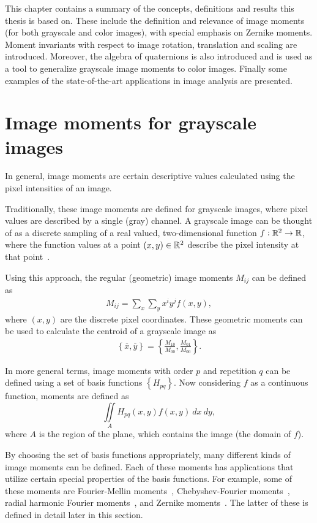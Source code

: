 This chapter contains a summary of the concepts, definitions and results this thesis is based on. These include the definition and relevance of image moments (for both grayscale and color images), with special emphasis on Zernike moments. Moment invariants with respect to image rotation, translation and scaling are introduced.
Moreover, the algebra of quaternions is also introduced and is used as a tool to generalize grayscale image moments to color images.
Finally some examples of the state-of-the-art applications in image analysis are presented.

\section{Image moments for grayscale images}\label{sec:grayscale}
In general, image moments are certain descriptive values calculated using the pixel intensities of an image. 

Traditionally, these image moments are defined for grayscale images, where pixel values are described by a single (gray) channel. A grayscale image can be thought of as a discrete sampling of a real valued, two-dimensional function $f : \mathbb{R}^2 \rightarrow \mathbb{R}$, where the function values at a point $(x,y) \in \mathbb{R}^2$ describe the pixel intensity at that point~\cite{moment_book}.

Using this approach, the regular (geometric) image moments $M_{ij}$ can be defined as
\begin{gather}
M_{ij} = \sum_x \sum_y x^iy^jf(x,y), \label{eq:geometric}
\end{gather} where $(x,y)$ are the discrete pixel coordinates.
These geometric moments can be used to calculate the centroid of a grayscale image as 
\begin{gather} \label{eq:centroid}
\left\{ \overline{x}, \overline{y} \right\} = \left\{ \frac{M_{10}}{M_{00}},  \frac{M_{01}}{M_{00}} \right\}.
\end{gather}

In more general terms, image moments with order $p$ and repetition $q$ can be defined using a set of basis functions $\left\{H_{pq}\right\}$. Now considering $f$ as a continuous function, moments are defined as
\begin{equation}\label{GeneralMoments}
\iint\limits_A H_{pq}(x,y)f(x,y)\ dx\ dy,
\end{equation} where $A$ is the region of the plane, which contains the image (the domain of $f$).

By choosing the set of basis functions appropriately, many different kinds of image moments can be defined. Each of these moments has applications that utilize certain special properties of the basis functions. For example, some of these moments are Fourier-Mellin moments~\cite{qfmm}, Chebyshev-Fourier moments~\cite{chebyshev-fourier}, radial harmonic Fourier moments~\cite{fourier}, and Zernike moments~\cite{zernike_moments}. The latter of these is defined in detail later in this section.


